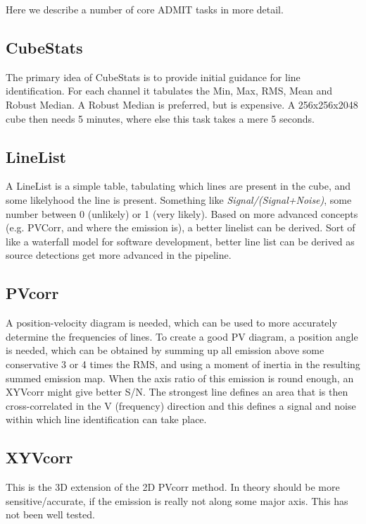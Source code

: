 \documentclass{article}
\begin{document}
Here we describe a number of core ADMIT tasks in more detail.

\subsection{CubeStats}

The primary idea of CubeStats is to provide initial guidance for line
identification. For each channel it tabulates the Min, Max, RMS, Mean
and Robust Median.  A Robust Median is preferred, but is expensive. A
256x256x2048 cube then needs 5 minutes, where else this task takes a
mere 5 seconds.

\subsection{LineList}

A LineList is a simple table, tabulating which lines are present
in the cube, and some likelyhood the line is present. Something like
{\it Signal/(Signal+Noise)}, some number between 0 (unlikely) or 1 
(very likely). Based on more advanced concepts (e.g. PVCorr, 
and where the emission is), a better linelist can be derived. Sort
of like a waterfall model for software development, better
line list can be derived as source detections get more advanced
in the pipeline.

\subsection{PVcorr}

A position-velocity diagram is needed, which can be used to more
accurately determine the frequencies of lines.  To create a good
PV diagram, a position angle is needed, which can be obtained
by summing up all emission above some conservative 3 or 4 times
the RMS, and using a moment of inertia in the resulting summed
emission map.  When the axis ratio of this emission is round
enough, an XYVcorr might give better S/N.  The strongest line
defines an area that is then cross-correlated in the V (frequency) 
direction and this defines a signal and noise within which line
identification can take place.

\subsection{XYVcorr}

This is the 3D extension of the 2D PVcorr method. In theory should be
more sensitive/accurate, if the emission is really not along some
major axis. This has not been well tested.
\end{document}

